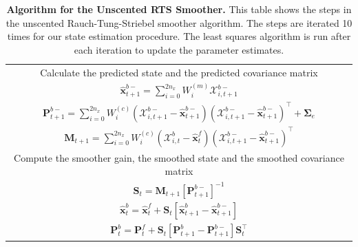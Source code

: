 \documentclass[5p,authoryear]{elsarticle}
\begin{document}
\begin{table}[!ht]
\begin{tabular}{|c|}
\multicolumn{1}{|p{16cm}|}{Calculate the predicted state and the predicted covariance matrix}\\
$\hat{\mathbf x}_{t+1}^{b-}=\sum_{i=0}^{2n_x} W_i^{(m)}\mathcal X_{i,t+1}^{b-}$\\
$\mathbf P_{t +1}^{b-}=\sum_{i=0}^{2n_x} W_i^{(c)}(\mathcal X_{i,t+1}^{b-}-\hat{\mathbf x}_{t +1}^{b-})(\mathcal X_{i,t+1}^{b-}-\hat{\mathbf x}_{t +1}^{b-})^\top+\boldsymbol \Sigma_e $\\
$\mathbf M_{t +1}=\sum_{i=0}^{2n_x} W_i^{(c)}(\mathcal X_{i,t}^{b}-\hat{\mathbf x}_{t}^{f})(\mathcal X_{i,t+1}^{b-}-\hat{\mathbf x}_{t+1}^{b-})^\top$\\
\multicolumn{1}{|p{16cm}|}{Compute the smoother gain, the smoothed state and the smoothed covariance matrix}\\
$\mathbf S_t=\mathbf M_{t +1}\left[ \mathbf P_{t +1}^{b-}\right] ^{-1} $\\
$\hat{\mathbf x}_t^b=\hat{\mathbf x}_t^f+\mathbf S_t\left[\hat{\mathbf x}_{t+1}^{b}-\hat{\mathbf x}_{t+1}^{b-}\right]$\\
$\mathbf P_{t}^{b}=\mathbf P_{t}^{f}+\mathbf S_t\left[\mathbf P_{t+1}^{b}-\mathbf P_{t+1}^{b-} \right]\mathbf S_t^\top $\\
\hline
\end{tabular}
\caption{\textbf{Algorithm for the Unscented RTS Smoother.} This table shows the steps in the unscented Rauch-Tung-Striebel smoother algorithm. The steps are iterated 10 times for our state estimation procedure. The least squares algorithm is run after each iteration to update the parameter estimates.}
\label{tab:UKFAlgorithm}
\end{table}
\clearpage
\newpage
\renewcommand{\arraystretch}{1}
\end{document}
